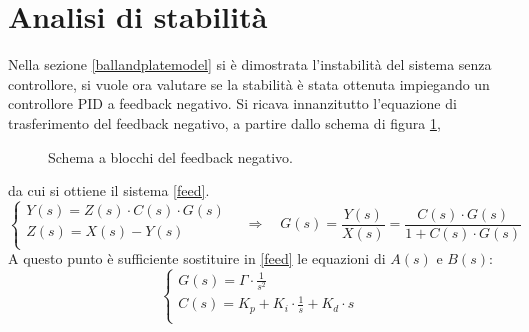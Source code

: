 \documentclass[12pt,twoside,openright]{report}
\begin{document}
\section{Analisi di stabilità}\label{stabilità}
Nella sezione \ref{ballandplatemodel} si è dimostrata l'instabilità del sistema senza controllore, si vuole ora valutare se la stabilità è stata ottenuta impiegando un controllore PID a feedback negativo. Si ricava innanzitutto l'equazione di trasferimento del feedback negativo, a partire dallo schema di figura \ref{fig:feedback},
\begin{figure}[h!]
\centering
{}
\caption{Schema a blocchi del feedback negativo.} \label{fig:feedback}
\end{figure}
 da cui si ottiene il sistema \eqref{feed}.
\begin{equation}\label{feed}
\begin{cases}
      Y(s)=Z(s)\cdot C(s)\cdot G(s)\\
      Z(s)=X(s)-Y(s)\\
    \end{cases}\quad \Rightarrow \quad G(s)=\frac{Y(s)}{X(s)}= \frac{C(s)\cdot G(s)}{1+C(s)\cdot G(s)}
\end{equation}
A questo punto è sufficiente sostituire in \eqref{feed} le equazioni di $A(s)$ e $B(s)$:
\begin{equation}\label{ab}
\begin{cases}
      G(s)=\Gamma\cdot \frac{1}{s^2}\\
      C(s)=K_p+K_i\cdot \frac{1}{s}+K_d\cdot s\\
    \end{cases}
\end{equation}
\end{document}
